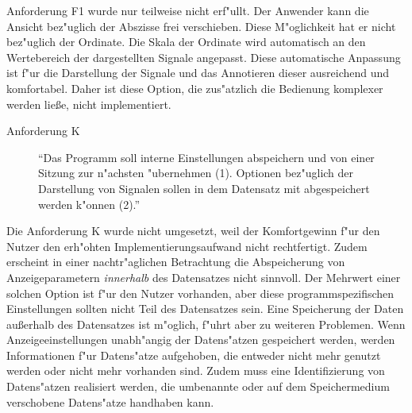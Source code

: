 Anforderung F1 wurde nur teilweise nicht erf"ullt.
Der Anwender kann die Ansicht bez"uglich der Abszisse frei verschieben.
Diese M"oglichkeit hat er nicht bez"uglich der Ordinate.
Die Skala der Ordinate wird automatisch an den Wertebereich der dargestellten Signale angepasst.
Diese automatische Anpassung ist f"ur die Darstellung der Signale und das Annotieren dieser ausreichend und komfortabel.
Daher ist diese Option, die zus"atzlich die Bedienung komplexer werden lie{\ss}e, nicht implementiert.


\begin{description}
	\item[Anforderung K] "`Das Programm soll interne Einstellungen abspeichern und von einer Sitzung zur n"achsten "ubernehmen (1).
					   Optionen bez"uglich der Darstellung von Signalen sollen in dem Datensatz mit abgespeichert werden k"onnen (2)."'
\end{description}

Die Anforderung K wurde nicht umgesetzt, weil der Komfortgewinn f"ur den Nutzer den erh"ohten Implementierungsaufwand nicht rechtfertigt.
Zudem erscheint in einer nachtr"aglichen Betrachtung die Abspeicherung von Anzeigeparametern \emph{innerhalb} des Datensatzes nicht sinnvoll.
Der Mehrwert einer solchen Option ist f"ur den Nutzer vorhanden, aber diese programmspezifischen Einstellungen sollten nicht Teil des Datensatzes sein.
Eine Speicherung der Daten au{\ss}erhalb des Datensatzes ist m"oglich, f"uhrt aber zu weiteren Problemen.
Wenn Anzeigeeinstellungen unabh"angig der Datens"atzen gespeichert werden, werden Informationen f"ur Datens"atze aufgehoben, die entweder nicht mehr genutzt werden oder nicht mehr vorhanden sind.
Zudem muss eine Identifizierung von Datens"atzen realisiert werden, die umbenannte oder auf dem Speichermedium verschobene Datens"atze handhaben kann.


